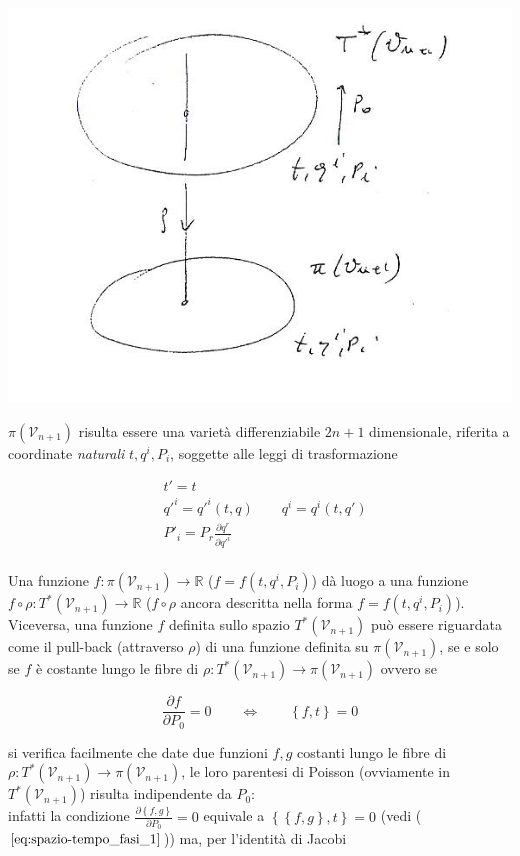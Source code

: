 
\begin{center}
\includegraphics[width=0.5\columnwidth]{media/spazio-tempo-delle-fasi-e-struttura-di-poisson-di-tale-spazio/25-1.jpg}
\end{center}

$\pi (\mathcal{V}_{n+1})$ risulta essere una varietà differenziabile $2n+1$ dimensionale, riferita a coordinate \textit{naturali} $ t, q^i, P_i $, soggette alle leggi di trasformazione

\begin{equation*}
\begin{split}
& t' = t  \\
& q'^i = q'^i (t, q) \qquad q^i = q^i (t, q') \\
&P'_i = P_r \frac{\partial q^r}{\partial q'^i} \\
\end{split}
\end{equation*}

Una funzione $ f : \pi (\mathcal{V}_{n+1}) \rightarrow \mathbb{R} $ ($ f = f (t, q^i, P_i) $) dà luogo a una funzione $ f \circ \rho : T^* (\mathcal{V}_{n+1}) \rightarrow \mathbb{R} $ ($ f \circ \rho $ ancora descritta nella forma $ f = f (t, q^i, P_i) $). Viceversa, una funzione $ f $ definita sullo spazio $T^* (\mathcal{V}_{n+1}) $  può essere riguardata come il pull-back (attraverso $\rho$) di una funzione definita su $\pi(\mathcal{V}_{n+1})$, se e solo se $ f $ è costante lungo le fibre di $ \rho : T^* (\mathcal{V}_{n+1}) \rightarrow \pi (\mathcal{V}_{n+1}) $ ovvero se

\begin{equation} \label{eq:spazio-tempo_fasi_1}
\frac{\partial f}{\partial P_0} = 0 \qquad \Leftrightarrow \qquad \left\lbrace f, t \right\rbrace = 0
\end{equation}

si verifica facilmente che date due funzioni $ f, g $ costanti lungo le fibre di $ \rho : T^*(\mathcal{V}_{n+1}) \rightarrow \pi(\mathcal{V}_{n+1}) $, le loro parentesi di Poisson (ovviamente in $ T^* (\mathcal{V}_{n+1}) $) risulta indipendente da $ P_0 $: \\
infatti la condizione $\frac{\partial \left\lbrace f, g \right\rbrace }{\partial P_{0}} = 0$ equivale a $\left\lbrace \left\lbrace f, g \right\rbrace, t \right\rbrace = 0 $ (vedi ($ \ref{eq:spazio-tempo_fasi_1} $)) ma, per l'identità di Jacobi

